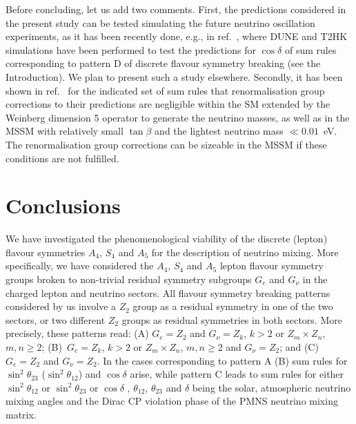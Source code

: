 \documentclass[11pt,a4paper]{article}
\def\th{\theta}
\numberwithin{equation}{section}
\begin{document}
 Before concluding, let us add two comments. 
First, the predictions considered in the present study can be tested 
simulating the future neutrino oscillation experiments, as 
it has been recently done, e.g., in ref.~\cite{Agarwalla:2017wct},  
where DUNE and T2HK simulations have been performed to test
the predictions for $\cos\delta$ of sum rules \cite{Petcov:2014laa} 
corresponding to pattern D of discrete flavour symmetry breaking 
(see the Introduction). We plan to present such a study elsewhere. 
Secondly, it has been shown in ref.~\cite{Gehrlein:2016fms} 
for the indicated set of sum rules 
that renormalisation group corrections to their predictions 
are negligible within the SM extended by the Weinberg dimension 5 operator 
to generate the neutrino masses, 
as well as in the MSSM with relatively 
small $\tan\beta$ and the lightest neutrino mass $\ll 0.01$~eV. 
The renormalisation group corrections can be sizeable in 
the MSSM if these conditions are not fulfilled.


\section{Conclusions}
\label{sec:conclusions}

 We have investigated the phenomenological viability of the discrete (lepton) flavour
symmetries $A_4$, $S_4$ and $A_5$ for the description of neutrino mixing. 
More specifically, we have considered the $A_4$, $S_4$ and $A_5$ 
lepton flavour symmetry groups broken to non-trivial residual symmetry
subgroups $G_e$ and $G_\nu$ in the charged lepton and neutrino sectors. 
All flavour symmetry breaking patterns considered by us 
involve a $Z_2$ group as a residual symmetry in one of the 
two sectors, or two different $Z_2$ groups as residual symmetries in both sectors. 
More precisely, these patterns read: 
(A) $G_e = Z_2$ and $G_{\nu} = Z_k$, $k > 2$ or $Z_m \times Z_n$, $m,n \geq 2$; 
(B)~$G_e = Z_k$, $k > 2$ or $Z_m \times Z_n$, $m,n \geq 2$ and $G_{\nu} = Z_2$;
and (C) $G_e = Z_2$ and $G_{\nu} = Z_2$. 
In the cases corresponding to pattern A (B) sum rules for 
$\sin^2\th_{23}$ ($\sin^2\th_{12}$) and $\cos\delta$ arise, 
while pattern C leads to sum rules for either 
$\sin^2\th_{12}$ or  $\sin^2\th_{23}$ or $\cos\delta$ \cite{Girardi:2015rwa}, 
$\theta_{12}$, $\theta_{23}$ and $\delta$ being the solar, 
atmospheric neutrino mixing angles and the Dirac 
CP violation phase of the PMNS neutrino mixing matrix.
 
\end{document}
